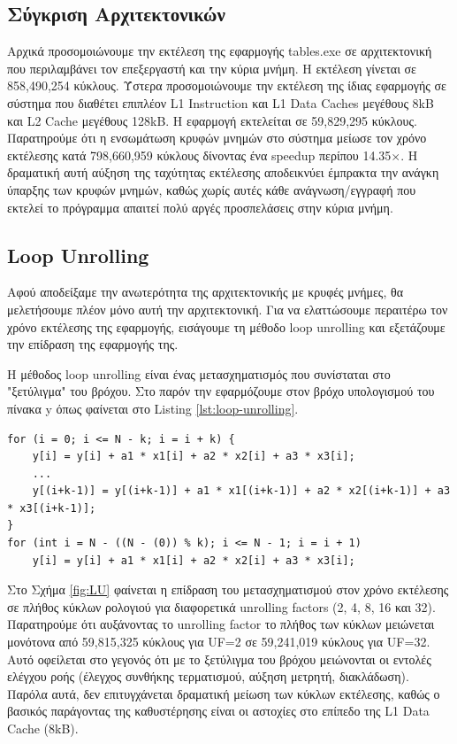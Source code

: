 \documentclass[12pt]{article}
\begin{document}


\subsection{Σύγκριση Αρχιτεκτονικών}
Αρχικά προσομοιώνουμε την εκτέλεση της εφαρμογής tables.exe σε αρχιτεκτονική που περιλαμβάνει τον επεξεργαστή και την κύρια μνήμη. Η εκτέλεση γίνεται σε 858,490,254 κύκλους. Ύστερα προσομοιώνουμε την εκτέλεση της ίδιας εφαρμογής σε σύστημα που διαθέτει επιπλέον L1 Instruction και L1 Data Caches μεγέθους 8kB και L2 Cache μεγέθους 128kB. Η εφαρμογή εκτελείται σε 59,829,295 κύκλους. Παρατηρούμε ότι η ενσωμάτωση κρυφών μνημών στο σύστημα μείωσε τον χρόνο εκτέλεσης κατά 798,660,959 κύκλους δίνοντας ένα speedup περίπου 14.35$\times$. Η δραματική αυτή αύξηση της ταχύτητας εκτέλεσης αποδεικνύει έμπρακτα την ανάγκη ύπαρξης των κρυφών μνημών, καθώς χωρίς αυτές κάθε ανάγνωση/εγγραφή που εκτελεί το πρόγραμμα απαιτεί πολύ αργές προσπελάσεις στην κύρια μνήμη.

\subsection{Loop Unrolling}
Αφού αποδείξαμε την ανωτερότητα της αρχιτεκτονικής με κρυφές μνήμες, θα μελετήσουμε πλέον μόνο αυτή την αρχιτεκτονική. Για να ελαττώσουμε περαιτέρω τον χρόνο εκτέλεσης της εφαρμογής, εισάγουμε τη μέθοδο loop unrolling και εξετάζουμε την επίδραση της εφαρμογής της.

Η μέθοδος loop unrolling είναι ένας μετασχηματισμός που συνίσταται στο "ξετύλιγμα" του βρόχου. Στο παρόν την εφαρμόζουμε στον βρόχο υπολογισμού του πίνακα y όπως φαίνεται στο Listing \ref{lst:loop-unrolling}.

\begin{lstlisting}[style=CStyle, caption=Loop Unrolling with Unrolling Factor k, label=lst:loop-unrolling]
for (i = 0; i <= N - k; i = i + k) {
	y[i] = y[i] + a1 * x1[i] + a2 * x2[i] + a3 * x3[i];
	...	
    y[(i+k-1)] = y[(i+k-1)] + a1 * x1[(i+k-1)] + a2 * x2[(i+k-1)] + a3 * x3[(i+k-1)];
}
for (int i = N - ((N - (0)) % k); i <= N - 1; i = i + 1) 
	y[i] = y[i] + a1 * x1[i] + a2 * x2[i] + a3 * x3[i];
\end{lstlisting}

Στο Σχήμα \ref{fig:LU} φαίνεται η επίδραση του μετασχηματισμού στον χρόνο εκτέλεσης σε πλήθος κύκλων ρολογιού για διαφορετικά unrolling factors (2, 4, 8, 16 και 32). Παρατηρούμε ότι αυξάνοντας το unrolling factor το πλήθος των κύκλων μειώνεται μονότονα από 59,815,325 κύκλους για UF=2 σε 59,241,019 κύκλους για UF=32. Αυτό οφείλεται στο γεγονός ότι με το ξετύλιγμα του βρόχου μειώνονται οι εντολές ελέγχου ροής (έλεγχος συνθήκης τερματισμού, αύξηση μετρητή, διακλάδωση). Παρόλα αυτά, δεν επιτυγχάνεται δραματική μείωση των κύκλων εκτέλεσης, καθώς ο βασικός παράγοντας της καθυστέρησης είναι οι αστοχίες στο επίπεδο της L1 Data Cache (8kB).
\end{document}
